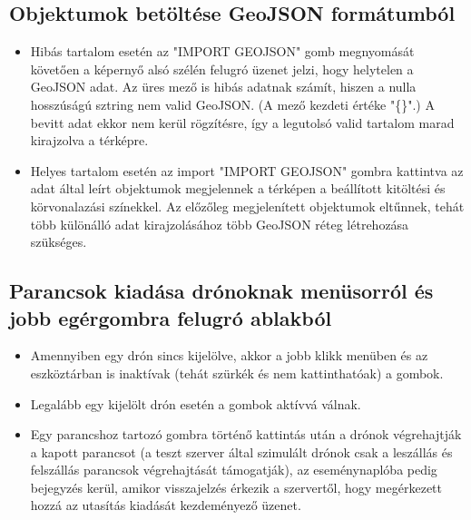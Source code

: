 \subsection{Objektumok betöltése GeoJSON formátumból}

\begin{itemize}

  \item Hibás tartalom esetén az "IMPORT GEOJSON" gomb megnyomását követően a
  képernyő alsó szélén felugró üzenet jelzi, hogy helytelen a GeoJSON adat. Az
  üres mező is hibás adatnak számít, hiszen a nulla hosszúságú sztring nem valid
  GeoJSON. (A mező kezdeti értéke "\{\}".) A bevitt adat ekkor nem kerül
  rögzítésre, így a legutolsó valid tartalom marad kirajzolva a térképre.

  \item Helyes tartalom esetén az import "IMPORT GEOJSON" gombra kattintva az
  adat által leírt objektumok megjelennek a térképen a beállított kitöltési és
  körvonalazási színekkel. Az előzőleg megjelenített objektumok eltűnnek, tehát
  több különálló adat kirajzolásához több GeoJSON réteg létrehozása szükséges.

\end{itemize}


\subsection{Parancsok kiadása drónoknak menüsorról és jobb egérgombra felugró ablakból}

\begin{itemize}

  \item Amennyiben egy drón sincs kijelölve, akkor a jobb klikk menüben és az
  eszköztárban is inaktívak (tehát szürkék és nem kattinthatóak) a gombok.

  \item Legalább egy kijelölt drón esetén a gombok aktívvá válnak.

  \item Egy parancshoz tartozó gombra történő kattintás után a drónok
  végrehajtják a kapott parancsot (a teszt szerver által szimulált drónok csak a
  leszállás és felszállás parancsok végrehajtását támogatják), az eseménynaplóba
  pedig bejegyzés kerül, amikor visszajelzés érkezik a szervertől, hogy
  megérkezett hozzá az utasítás kiadását kezdeményező üzenet.

\end{itemize}


